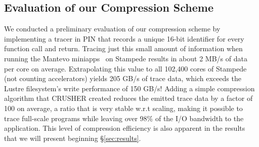 \subsection{Evaluation of our Compression Scheme}

We conducted a preliminary evaluation of our compression
scheme by implementing a tracer in PIN that
records a unique 16-bit identifier for every function call and
return. 
%
Tracing just this small amount of information when running the
Mantevo miniapps~\cite{mantevo} on Stampede results in about 2 MB/s of
data per core on average. Extrapolating this value to all 102,400
cores of Stampede (not counting accelerators) yields 205 GB/s of trace
data, which exceeds the Lustre filesystem's write performance of 150
GB/s! 
%
Adding a simple compression algorithm that CRUSHER created 
reduces the emitted trace data by a factor of 100 on average,
a ratio that is very stable w.r.t scaling, making it possible to trace
full-scale programs while leaving over 98\% of the I/O bandwidth to
the application. 
%
This level of compression efficiency is also apparent in the 
results that we will present beginning \S\ref{sec:results}.

